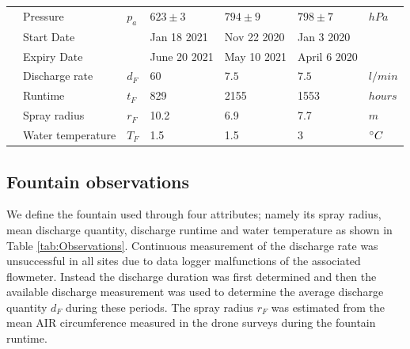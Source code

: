 \documentclass[utf8]{frontiersSCNS}
\begin{document}
\begin{table}
\begin{tabular}{@{}|lllllll|@{}}
		\multicolumn{1}{|l|}{} & Pressure                    & $p_a         $  & $623 \pm 3$   & $794 \pm 9$  &
		$798 \pm7$             & $hPa$                                                                                                     \\
		\multicolumn{1}{|l|}{} & Start Date         &     & Jan 18 2021   & Nov 22 2020
		                       & Jan 3 2020                       &                                                                      \\
		\multicolumn{1}{|l|}{} & Expiry Date      &     & June 20 2021 & May 10 2021
		                       & April 6 2020                &                                                                      \\\bottomrule
		\multicolumn{1}{|l|}{\multirow{4}{*}{\rotatebox[origin=c]{90}{Fountain}}}
		                       & Discharge rate             & $d_F     $      & $60$          & $7.5$        &
		$7.5$                  & $l/min$                                                                                                   \\
		\multicolumn{1}{|l|}{} & Runtime                     & $t_F $          & 829           & 2155
		                       & 1553                        & $hours$                                                                     \\
		\multicolumn{1}{|l|}{} & Spray radius                & $r_{F}$         & 10.2          & 6.9
		                       & 7.7                         & $m$                                                                         \\
		\multicolumn{1}{|l|}{} & Water temperature           & $T_{F}$         & 1.5             & 1.5
		                       & 3                           & $\degree C$                                                                 \\\midrule
	\end{tabular}
\end{table}


\subsection{Fountain observations}

We define the fountain used through four attributes; namely its spray radius, mean discharge quantity, discharge
runtime and water temperature as shown in Table \ref{tab:Observations}. Continuous measurement of the discharge
rate was unsuccessful in all sites due to data logger malfunctions of the associated flowmeter. Instead the
discharge duration was first determined and then the available discharge measurement was used to determine the
average discharge quantity $d_F$ during these periods.  The spray radius $r_F$ was estimated from the mean AIR
circumference measured in the drone surveys during the fountain runtime.
\end{document}
